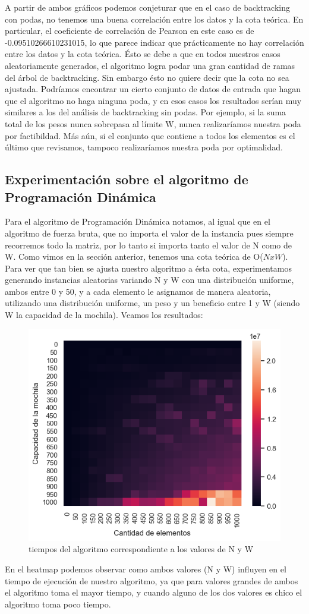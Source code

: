 A partir de ambos gráficos podemos conjeturar que en el caso de backtracking con podas, no tenemos una buena correlación entre los datos y la cota teórica. En particular, el coeficiente de correlación de Pearson en este caso es de -0.09510266610231015, lo que parece indicar que prácticamente no hay correlación entre los datos y la cota teórica. Ésto se debe a que en todos nuestros casos aleatoriamente generados, el algoritmo logra podar una gran cantidad de ramas del árbol de backtracking. Sin embargo ésto no quiere decir que la cota no sea ajustada. Podríamos encontrar un cierto conjunto de datos de entrada que hagan que el algoritmo no haga ninguna poda, y en esos casos los resultados serían muy similares a los del análisis de backtracking sin podas. Por ejemplo, si la suma total de los pesos nunca sobrepasa al límite W, nunca realizaríamos nuestra poda por factibildad. Más aún, si el conjunto que contiene a todos los elementos es el último que revisamos, tampoco realizaríamos nuestra poda por optimalidad.


\subsection{Experimentación sobre el algoritmo de Programación Dinámica}
Para el algoritmo de Programación Dinámica notamos, al igual que en el algoritmo de fuerza bruta, que no importa el valor de la instancia pues siempre recorremos todo la matriz, por lo tanto si importa tanto el valor de N como de W. Como vimos en la sección anterior, tenemos una cota teórica de O($NxW$). Para ver que tan bien se ajusta nuestro algoritmo a ésta cota, experimentamos generando instancias aleatorias variando N y W con una distribución uniforme, ambos entre 0 y 50, y a cada elemento le asignamos de manera aleatoria, utilizando una distribución uniforme, un peso y un beneficio entre 1 y W (siendo W la capacidad de la mochila). Veamos los resultados:
\begin{center}

\begin{figure}[H]
     \centering
     \includegraphics[width=0.5\linewidth]{img/heatmap}
     \caption{tiempos del algoritmo correspondiente a los valores de N y W}
\end{figure}

\end{center}
En el heatmap podemos observar como ambos valores (N y W) influyen en el tiempo de ejecución de nuestro algoritmo, ya que para valores grandes de ambos el algoritmo toma el mayor tiempo, y cuando alguno de los dos valores es chico el algoritmo toma poco tiempo.

